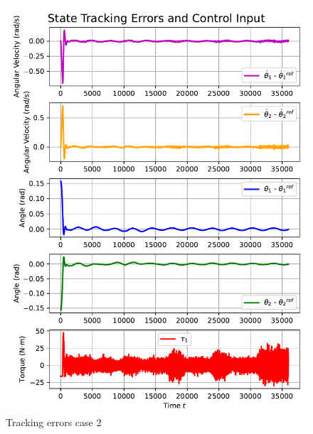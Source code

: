 \begin{figure}[htb]
    \centering
    \includegraphics[width=1\linewidth]{img/4-task4/MPC2_errors.pdf}
    \caption{Tracking errors case 2}
    \label{fig:dtheta1-evolution}
\end{figure}

